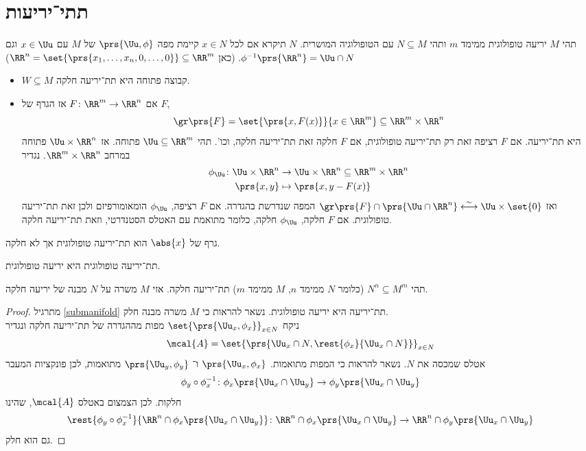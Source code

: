 \documentclass[a4paper,10pt,twoside,openany]{book}
\begin{document}
\section{תתי־יריעות}
\begin{definition}
תהי
$M$
יריעה טופולוגית
ממימד
$m$
ותהי
$N \subseteq M$
עם הטופולוגיה המושרית.
$N$
תיקרא
אם לכל
$x \in N$
קיימת מפה
$\prs{\Uu,\phi}$
של
$M$
עם
$x \in \Uu$
וגם
$\phi^{-1}\prs{\RR^n} = \Uu \cap N$.
(כאן
$\RR^n = \set{\prs{x_1, \ldots, x_n, 0, \ldots, 0}} \subseteq \RR^m$)
\end{definition}
\begin{examples}
\begin{itemize}
\item $W \subseteq M$
קבוצה פתוחה היא תת־יריעה חלקה.
\item אם
$F \colon \RR^m \to \RR^n$
אז הגרף של
$F$,
\[\gr\prs{F} = \set{\prs{x,F(x)}}{x \in \RR^m} \subseteq \RR^m \times \RR^n\]
היא תת־יריעה.
אם
$F$
רציפה זאת רק תת־יריעה טופולוגית, אם
$F$
חלקה זאת תת־יריעה חלקה, וכו'.
תהי
$\Uu \subseteq \RR^m$
פתוחה. אז
$\Uu \times \RR^n$
פתוחה במרחב
$\RR^m \times \RR^n$.
נגדיר
\begin{align*}
\phi_{\Uu} \colon \Uu \times \RR^n &\to \Uu \times \RR^n \subseteq \RR^m \times \RR^n \\
\prs{x,y} &\mapsto \prs{x,y-F(x)}
\end{align*}
ואז
$\gr\prs{F} \cap \prs{\Uu \cap \RR^n} \stackrel{\sim}{\longleftrightarrow} \Uu \times \set{0}$
המפה שנדרשת בהגדרה.
אם
$F$
רציפה,
$\phi_{\Uu}$
הומאומורפיזם ולכן זאת תת־יריעה טופולוגית.
אם
$F$
חלקה,
$\phi_{\Uu}$
חלקה, כלומר מתואמת עם האטלס הסטנדרטי, וזאת תת־יריעה חלקה.
\end{itemize}
\end{examples}
\begin{exercise}
גרף של
$\abs{x}$
הוא תת־יריעה טופולוגית אך לא חלקה.
\end{exercise}
\begin{exercise}\label{submanifold}
תת־יריעה טופולוגית היא יריעה טופולוגית.
\end{exercise}
\begin{proposition}
תהי
$N^n \subseteq M^m$
(כלומר
$N$
ממימד
$n$,
$M$
ממימד
$m$)
תת־יריעה חלקה. אזי
$M$
משרה על
$N$
מבנה של יריעה חלקה.
\end{proposition}
\begin{proof}
מתרגיל
\ref{submanifold}
תת־יריעה היא יריעה טופולוגית. נשאר להראות כי
$M$
משרה מבנה חלק.\\
ניקח
$\set{\prs{\Uu_x,\phi_x}}_{x \in N}$
מפות מההגדרה של תת־יריעה חלקה ונגדיר
\[\mcal{A} = \set{\prs{\Uu_x \cap N, \rest{\phi_x}{\Uu_x \cap N}}}_{x \in N}\]
אטלס שמכסה את
$N$.
נשאר להראות כי המפות מתואמות.
$\prs{\Uu_x, \phi_x}$
ו־%
$\prs{\Uu_y, \phi_y}$
מתואמות, לכן פונקציות המעבר
\[\phi_y \circ \phi_x^{-1} \colon \phi_x\prs{\Uu_x \cap \Uu_y} \to \phi_y\prs{\Uu_x \cap \Uu_y}\]
חלקות.
לכן הצמצום באטלס
$\mcal{A}$,
שהינו
\[\rest{\phi_y \circ \phi_x^{-1}}{\RR^n \cap \phi_x\prs{\Uu_x \cap \Uu_y}} \colon \RR^n \cap \phi_x\prs{\Uu_x \cap \Uu_y} \to \RR^n \cap \phi_y\prs{\Uu_x \cap \Uu_y}\]
גם הוא חלק.
\end{proof}
\end{document}
